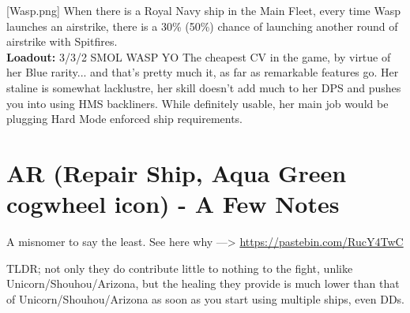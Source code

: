 [Wasp.png]
{When there is a Royal Navy ship in the Main Fleet, every time Wasp launches an airstrike, there is a 30\% (50\%) chance of launching another round of airstrike with Spitfires.\\
\textbf{Loadout:} 3/3/2}
{SMOL WASP YO }
{The cheapest CV in the game, by virtue of her Blue rarity... and that's pretty much it, as far as remarkable features go. Her staline is somewhat lacklustre, her skill doesn't add much to her DPS and pushes you into using HMS backliners. While definitely usable, her main job would be plugging Hard Mode enforced ship requirements.}


\newpage
\section[AR]{AR (Repair Ship, Aqua Green cogwheel icon) - A Few Notes}
 
A misnomer to say the least. See here why ---> \url{https://pastebin.com/RucY4TwC}

TLDR; not only they do contribute little to nothing to the fight, unlike Unicorn/Shouhou/Arizona, but the healing they provide is much lower than that of Unicorn/Shouhou/Arizona as soon as you start using multiple ships, even DDs.

